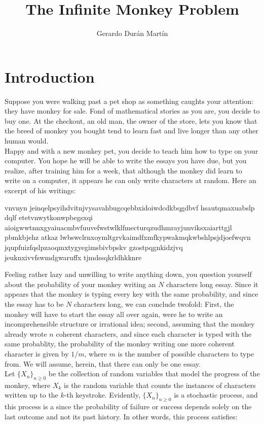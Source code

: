 \documentclass{article}
\title{The Infinite Monkey Problem}
\author{Gerardo Durán Martín}
\newcommand{\SP}{\{X_n\}_{n\geq 0}}
\begin{document}
\maketitle
\tableofcontents{}

\section{Introduction}
Suppose you were walking past a pet shop as something caughts your attention: they have monkey for sale. Fond of mathematical stories as you are, you decide to buy one. At the checkout, an old man, the owner of the store, lets you know that the breed of monkey you bought tend to learn fast and live longer than any other human would.\\

Happy and with a new monkey pet, you decide to teach him how to type on your computer. You hope he will be able to write the essays you have due, but you realize, after training him for a week, that although the monkey did learn to write on a computer, it appears he can only write characters at random. Here an excerpt of his writings:

\begin{displayquote}
    vnvnyn jeinqelpsyihdvitnjvysavahbugcqebbxidoiwdcdkbqgdbvf hsautqmaxuabslp  dqlf etetvnwytkonwpbegsxqi aioigwwtnnxgyaiuacmbvfuuvefwstwlklfmecturqzudhmrayjunviksxaiarttgjl pbmkbjehz atkaz lwbswclrnxoymltgrvkaimdfxmfkypwakmqkwbshlpsjdjoefwqvn jqupfuizfqslpzaoqmxtygyegimsbivbpskv gzostpqgnkidzjvq  jeuknxivvfswmdgwaruffx tjmdssqkrldhkknre
\end{displayquote}

Feeling rather lazy and unwilling to write anything down, you question yourself about the probability of your monkey writing an $N$ characters long essay. Since it appears that the monkey is typing every key with the same probability, and since the essay has to be $N$ characters long, we can conclude twofold: First, the monkey will have to start the essay all over again, were he to write an incomprehensible structure or irrational idea; second, assuming that the monkey already wrote $n$ coherent characters, and since each character is typed with the same probablity, the probability of the monkey writing one more coherent character is given by $1/m$, where $m$ is the number of possible characters to type from. We will assume, herein, that there can only be one  essay. \\ 

Let $\SP$ be the collection of random variables that model the progress of the monkey, where $X_k$ is the random variable that counts the instances of  characters written up to the $k$-th keystroke. Evidently, $\SP$ is a stochastic process, and this process is a  since the probability of failure or success depends solely on the last outcome and not its past history. In other words, this process satisfies:
\end{document}
